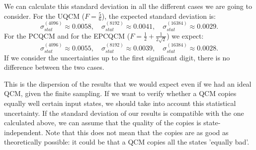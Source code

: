 We can calculate this standard deviation in all the different cases we are going to consider.
For the UQCM ($F=\frac{5}{6}$), the expected standard deviation is:
\begin{equation}
    \sigma_{stat}^{(4096)}\approx 0.0058, \quad \sigma_{stat}^{(8192)}\approx 0.0041, \quad \sigma_{stat}^{(16384)}\approx 0.0029.
    \label{eqn:dispersion_uqcm}
\end{equation}
For the PCQCM and for the EPCQCM ($F=\frac{1}{2}+\frac{1}{2\sqrt{2}}$) we expect:
\begin{equation}
    \sigma_{stat}^{(4096)}\approx 0.0055, \quad \sigma_{stat}^{(8192)}\approx 0.0039, \quad \sigma_{stat}^{(16384)}\approx 0.0028.
    \label{eqn:dispersion_pcqcm}
\end{equation}
If we consider the uncertainties up to the first significant digit, there is no difference between the two cases.

This is the dispersion of the results that we would expect even if we had an ideal QCM, given the finite sampling.
If we want to verify whether a QCM copies equally well certain input states, we should take into account this statistical uncertainty.
If the standard deviation of our results is compatible with the one calculated above, we can assume that the quality of the copies is state-independent.
Note that this does not mean that the copies are as good as theoretically possible: it could be that a QCM copies all the states 'equally bad'.  
